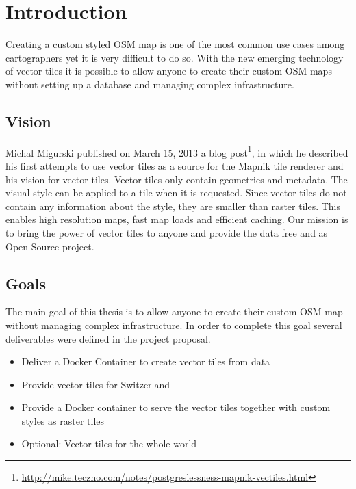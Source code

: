 \chapter{Introduction}


Creating a custom styled OSM map is one of the most common use cases
among cartographers yet it is very difficult to do so. With the new
emerging technology of vector tiles it is possible to allow anyone to
create their custom OSM maps without setting up a database and
managing complex infrastructure.


\section{Vision}\label{vision}

Michal Migurski published on March 15, 2013 a blog
post\footnote{\url{http://mike.teczno.com/notes/postgreslessness-mapnik-vectiles.html}},
in which he described his first attempts to use vector tiles as a source
for the Mapnik tile renderer and his vision for vector tiles.
\newline{}
Vector tiles only contain geometries and metadata. The visual style can
be applied to a tile when it is requested. Since vector tiles do not
contain any information about the style, they are smaller than raster
tiles. This enables high resolution maps, fast map loads and efficient
caching.
\newline{}
Our mission is to bring the power of vector tiles to anyone and provide
the data free and as Open Source project.


\section{Goals}\label{targets}

The main goal of this thesis is to allow anyone to create their custom
OSM map without managing complex infrastructure. In order to complete this goal
several deliverables were defined in the project proposal.

\begin{itemize}
\item
  Deliver a Docker Container to create vector tiles from \osm{} data
\item
  Provide vector tiles for Switzerland
\item
  Provide a Docker container to serve the vector tiles together with
  custom styles as raster tiles
\item
  Optional: Vector tiles for the whole world
\end{itemize}

